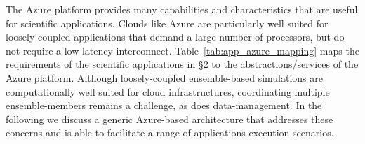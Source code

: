 \documentclass[3p,twocolumn]{elsarticle}
\begin{document}
The Azure platform provides many capabilities and characteristics that
are useful for scientific applications. Clouds like Azure are
particularly well suited for loosely-coupled applications that demand
a large number of processors, but do not require a low latency
interconnect. Table~\ref{tab:app_azure_mapping} maps the requirements
of the scientific applications in \S2 to the abstractions/services of
the Azure platform.
Although loosely-coupled ensemble-based simulations are
computationally well suited for cloud infrastructures, coordinating
multiple ensemble-members remains a challenge, as does
data-management.
In the following we discuss a generic Azure-based architecture that
addresses these concerns and is able to facilitate a range of
applications execution scenarios.
\end{document}

